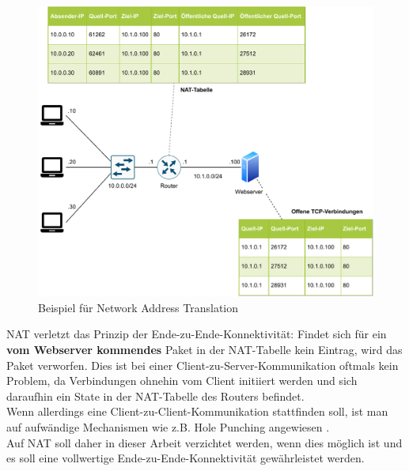 \begin{figure}[h]
  \centering
  \includegraphics[scale=0.90]{Figures/napt.pdf}
  \caption{Beispiel für Network Address Translation}
  \label{grafik: napt}
\end{figure}\FloatBarrier

NAT\label{nat-bad} verletzt das Prinzip der Ende-zu-Ende-Konnektivität: Findet sich für ein \textbf{vom Webserver kommendes} Paket in der \gls{NAT}-Tabelle kein Eintrag, wird das Paket verworfen. Dies ist bei einer \gls{Client}-zu-Server-Kommunikation oftmals kein Problem, da Verbindungen ohnehin vom \gls{Client} initiiert werden und sich daraufhin ein State in der \gls{NAT}-Tabelle des Routers befindet.\\
Wenn allerdings eine \gls{Client}-zu-\gls{Client}-Kommunikation stattfinden soll, ist man auf aufwändige Mechanismen wie z.B. Hole Punching angewiesen \cite[S.317]{Fall2011}.\\
Auf \gls{NAT} soll daher in dieser Arbeit verzichtet werden, wenn dies möglich ist und es soll eine vollwertige Ende-zu-Ende-Konnektivität gewährleistet werden.

